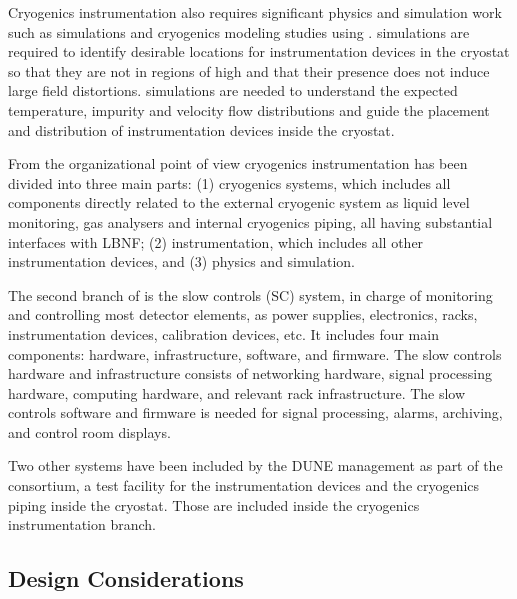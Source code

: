 Cryogenics instrumentation also requires significant physics and
simulation work such as \efield simulations and cryogenics modeling
studies using . \efield simulations
are required to identify desirable locations for instrumentation
devices in the cryostat so that they are not in regions of high \efield and
that their presence does not induce large field distortions. 
simulations are needed to understand the expected temperature,
impurity and velocity flow distributions and guide the placement and
distribution of instrumentation devices inside the cryostat.


From the organizational point of view
cryogenics instrumentation has been divided into three main parts: (1) cryogenics systems, which includes all components directly related to the external cryogenic system as
liquid level monitoring, gas analysers and internal cryogenics piping, all having substantial interfaces with LBNF; (2) \lar  instrumentation, which includes all
other instrumentation devices, and (3) physics and simulation.


The second branch of  is the slow controls (SC) system, in charge of monitoring and controlling most detector elements, as power supplies, electronics, racks, instrumentation devices,
calibration devices, etc. It includes four main components: hardware, infrastructure,
software, and firmware. The slow controls hardware and infrastructure consists of
networking hardware, signal processing hardware, computing hardware, and relevant
rack infrastructure. The slow controls software and firmware is needed for
signal processing, alarms, archiving, and control room displays.

Two other systems have been included by the DUNE management as part of the  consortium,
a test facility for the instrumentation devices and the cryogenics piping inside the cryostat.
Those are included inside the cryogenics instrumentation branch.



\subsection{Design Considerations}
\label{sec:fdsp-slow-cryo-des-consid}

